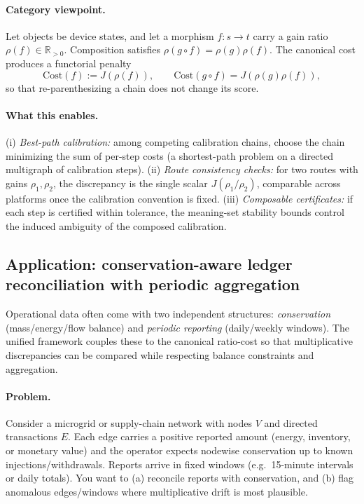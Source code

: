 \documentclass[11pt,reqno]{amsart}
\theoremstyle{plain}
\theoremstyle{definition}
\theoremstyle{remark}
\newcommand{\Jcost}{J}
\newcommand{\RR}{\mathbb{R}}
\newcommand{\1}{\mathbf{1}}
\begin{document}
\paragraph{Category viewpoint.}
Let objects be device states, and let a morphism $f:s\to t$ carry a gain ratio $\rho(f)\in\RR_{>0}$.
Composition satisfies $\rho(g\circ f)=\rho(g)\rho(f)$.  The canonical cost produces a functorial
penalty
\[
\mathrm{Cost}(f):=\Jcost(\rho(f)),
\qquad
\mathrm{Cost}(g\circ f)=\Jcost(\rho(g)\rho(f)),
\]
so that re-parenthesizing a chain does not change its score.

\paragraph{What this enables.}
(i) \emph{Best-path calibration:} among competing calibration chains, choose the chain minimizing the
sum of per-step costs (a shortest-path problem on a directed multigraph of calibration steps).
(ii) \emph{Route consistency checks:} for two routes with gains $\rho_1,\rho_2$, the discrepancy is the
single scalar $\Jcost(\rho_1/\rho_2)$, comparable across platforms once the calibration convention is fixed.
(iii) \emph{Composable certificates:} if each step is certified within tolerance, the meaning-set stability
bounds control the induced ambiguity of the composed calibration.


\subsection{Application: conservation-aware ledger reconciliation with periodic aggregation}\label{subsec:app-ledger}
Operational data often come with two independent structures: \emph{conservation} (mass/energy/flow
balance) and \emph{periodic reporting} (daily/weekly windows).  The unified framework couples these
to the canonical ratio-cost so that multiplicative discrepancies can be compared while respecting balance
constraints and aggregation.

\paragraph{\textbf{Problem.}}
Consider a microgrid or supply-chain network with nodes $V$ and directed transactions $E$.
Each edge carries a positive reported amount (energy, inventory, or monetary value) and the operator
expects nodewise conservation up to known injections/withdrawals.  Reports arrive in fixed windows
(e.g.\ 15-minute intervals or daily totals).  You want to (a) reconcile reports with conservation, and
(b) flag anomalous edges/windows where multiplicative drift is most plausible.
\end{document}
